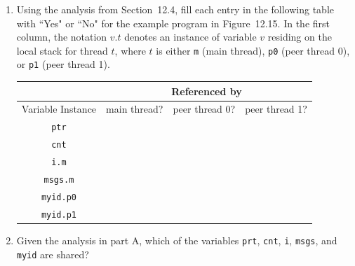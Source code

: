 \documentclass[12pt]{article}
\newenvironment{ex}[2][Exercise]{\begin{trivlist}
		\item[\hskip \labelsep {\bfseries #1}\hskip \labelsep {\bfseries #2.}]}{\end{trivlist}}
\begin{document}
\begin{ex}{12.6}
	\begin{enumerate}[label=(\alph*)]
		\item Using the analysis from Section~12.4, fill each entry in the following table with
		``Yes" or ``No" for the example program in Figure~12.15. In the first column, the
		notation $v.t$ denotes an instance of variable $v$ residing on the local stack for
		thread $t$, where $t$ is either \texttt{m} (main thread), \texttt{p0} (peer thread 0),
		or \texttt{p1} (peer thread 1).
		
		\begin{center}
			\begin{tabular}{cccc}
				{} & \multicolumn{3}{c}{Referenced by}\\
				\hline
				Variable Instance & main thread? & peer thread 0? & peer thread 1?\\
				\hline
				\texttt{ptr} & {} & {} & {} \\
				\texttt{cnt} & {} & {} & {} \\
				\texttt{i.m} & {} & {} & {} \\
				\texttt{msgs.m} & {} & {} & {} \\
				\texttt{myid.p0} & {} & {} & {} \\
				\texttt{myid.p1} & {} & {} & {} \\
			\end{tabular}
		\end{center}
		
		\item Given the analysis in part A, which of the variables \texttt{prt}, \texttt{cnt},
		\texttt{i}, \texttt{msgs}, and \texttt{myid} are shared?
	\end{enumerate}
\end{ex}
\end{document}
